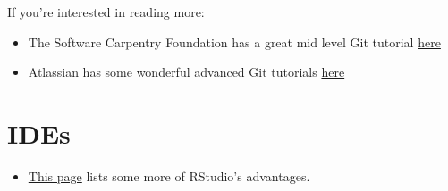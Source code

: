 \documentclass[
]{book}
\providecommand{\tightlist}{%
  \setlength{\itemsep}{0pt}\setlength{\parskip}{0pt}}
\begin{document}
If you're interested in reading more:

\begin{itemize}
\tightlist
\item
  The Software Carpentry Foundation has a great mid level Git tutorial \href{https://swcarpentry.GitHub.io/git-novice/}{here}
\item
  Atlassian has some wonderful advanced Git tutorials \href{https://www.atlassian.com/git/tutorials/advanced-overview}{here}
\end{itemize}

\hypertarget{ides}{%
\section{IDEs}\label{ides}}

\begin{itemize}
\tightlist
\item
  \href{https://www.theanalysisfactor.com/the-advantages-of-rstudio/}{This page} lists some more of RStudio's advantages.
\end{itemize}
\end{document}

